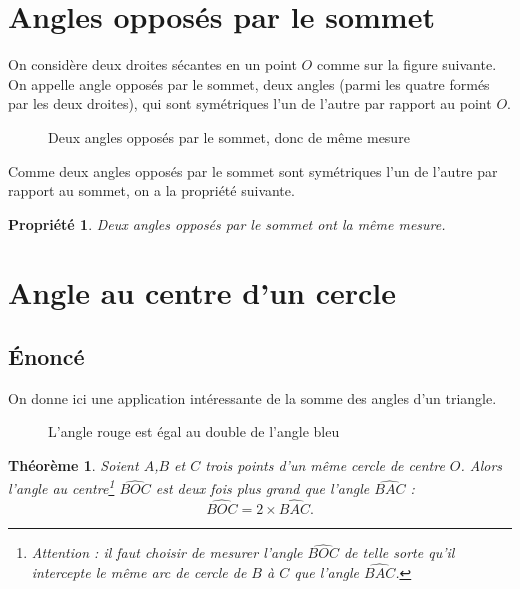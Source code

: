 \documentclass[12 pt]{article}
\theoremstyle{plain}
\newcounter{n}
\numberwithin{n}{section}
\newtheorem{theo}{Théorème}
\newtheorem*{prop}{Propriété}
\begin{document}
\section{Angles opposés par le sommet}
On considère deux droites sécantes en un point $O$ comme sur la figure suivante. 
On appelle angle opposés par le sommet, deux angles (parmi les quatre formés par les deux droites), qui sont symétriques l'un de l'autre par rapport au point $O$. 
\begin{figure}[H]\center
{}
\caption{Deux angles opposés par le sommet, donc de même mesure}
\end{figure}
Comme deux angles opposés par le sommet sont symétriques l'un de l'autre par rapport au sommet, on a la 
propriété suivante. 
\begin{prop}
Deux angles opposés par le sommet ont la même mesure.
\end{prop}

\section{Angle au centre d'un cercle}
\subsection{Énoncé}
On donne ici une application intéressante de la somme des angles d'un triangle. 

\begin{figure}[H]
\center
{}
\caption{L'angle rouge est égal au double de l'angle bleu}
\end{figure}

\begin{theo}
Soient $A$,$B$ et $C$ trois points d'un même cercle de centre $O$. Alors l'angle au centre\footnote{Attention : il faut choisir de mesurer l'angle $\widehat{BOC}$ de telle sorte qu'il intercepte le même arc de cercle de $B$ à $C$ que l'angle $\widehat{BAC}$.} $\widehat{BOC}$
est deux fois plus grand que l'angle $\widehat{BAC}$ : \[ \widehat{BOC} = 2\times \widehat{BAC}.\]
\end{theo}
\end{document}
